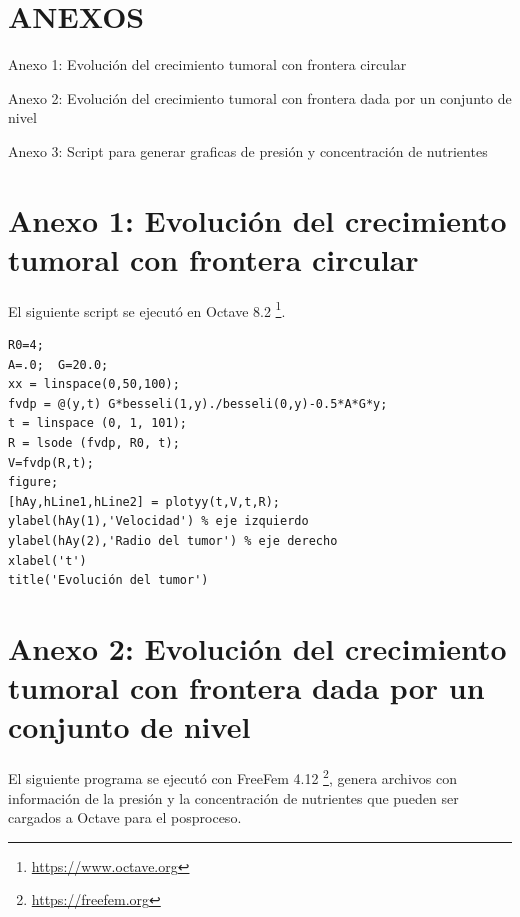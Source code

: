\chapter*{\MakeUppercase{Anexos}}
\thispagestyle{fancy}

\noindent Anexo 1: Evolución del crecimiento tumoral con frontera circular 

\noindent Anexo 2: Evolución del crecimiento tumoral con frontera dada por un conjunto de nivel  

\noindent Anexo 3: Script para generar graficas de presión y concentración de nutrientes  
\chapter*{Anexo 1: Evolución del crecimiento tumoral con frontera circular}
\setcounter{page}{1}
\thispagestyle{fancy}
El siguiente script se ejecutó en Octave 8.2 \footnote{\url{https://www.octave.org}}.
\begin{lstlisting}
R0=4;
A=.0;  G=20.0;
xx = linspace(0,50,100);
fvdp = @(y,t) G*besseli(1,y)./besseli(0,y)-0.5*A*G*y;
t = linspace (0, 1, 101);
R = lsode (fvdp, R0, t);
V=fvdp(R,t);
figure;
[hAy,hLine1,hLine2] = plotyy(t,V,t,R);
ylabel(hAy(1),'Velocidad') % eje izquierdo
ylabel(hAy(2),'Radio del tumor') % eje derecho
xlabel('t')
title('Evolución del tumor')
\end{lstlisting}
\chapter*{Anexo 2: Evolución del crecimiento tumoral con frontera dada por un conjunto de nivel}
\thispagestyle{fancy}
El siguiente programa se ejecutó con FreeFem 4.12 \footnote{\url{https://freefem.org}}, genera archivos con información de la presión y la concentración de nutrientes que pueden ser cargados a Octave para el posproceso.

